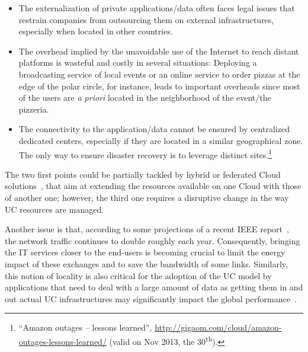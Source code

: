 \begin{itemize}
\item The externalization of private applications/data often faces legal issues
that restrain companies from outsourcing them on external infrastructures,
especially when located in other countries. 
\item The overhead implied by the unavoidable use of the Internet to reach
distant platforms is wasteful and costly in several situations: Deploying a
broadcasting service of local events or an online service to order pizzas at the
edge of the polar circle, for instance, leads to important overheads since
most of the users are \emph{a priori} located in the neighborhood of the
event/the pizzeria.  
\item The connectivity to the application/data cannot be ensured by centralized
dedicated centers, especially if they are located in a similar geographical
zone. The only way to ensure disaster recovery is to leverage distinct
sites.\footnote{``Amazon outages – lessons learned'',
\href{http://gigaom.com/cloud/amazon-outages-lessons-learned/}{http://gigaom.com/cloud/amazon-outages-lessons-learned/}
(valid on  Nov 2013, the 30\textsuperscript{th}).} 
\end{itemize}

The two first points could be partially tackled by hybrid or federated Cloud
solutions~\cite{armbrust:2010}, that aim at extending
the resources available on one Cloud with those of another one; however, the third 
one requires a disruptive change in
the way UC resources are managed.

Another issue is that, according to some projections of a recent IEEE
report~\cite{ieeenetreport:2012}, the network traffic continues to double roughly each
year. Consequently, bringing the IT services closer to the end-users is becoming crucial to limit
the energy impact of these exchanges and to save the bandwidth of some links. Similarly,
this notion of locality is also critical for the adoption of the UC model by applications
that need to deal with a large amount of data as getting them in and out actual UC
infrastructures may significantly impact the global performance~\cite{Fos11}. 

